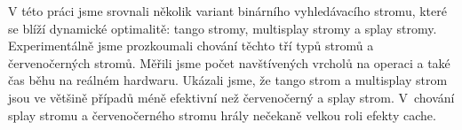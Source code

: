 \documentclass[12pt]{report}
\begin{document}
V této práci jsme srovnali několik variant binárního vyhledávacího stromu, které se
blíží dynamické optimalitě: tango stromy,
multisplay stromy a splay stromy. 
Experimentálně jsme prozkoumali chování těchto tří typů stromů a červenočerných stromů. Měřili jsme počet navštívených vrcholů na
operaci a také čas běhu na reálném hardwaru. Ukázali jsme, že tango strom a multisplay strom jsou ve většině případů méně efektivní než červenočerný a
splay strom. V~chování splay stromu a červenočerného stromu hrály nečekaně velkou roli efekty cache.
\end{document}
